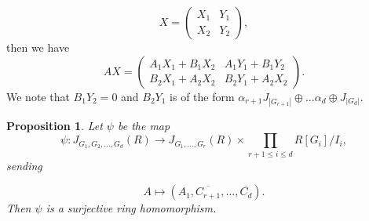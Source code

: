\documentclass[12pt, a4paper]{amsart}
\numberwithin{equation}{section} %
\theoremstyle{plain}
\theoremstyle{definition}
\theoremstyle{plain}
\newtheorem{prop}[thm]{Proposition}
\theoremstyle{remark}
\newcommand{\ones}{J}
\begin{document}
\[ X =\begin{pmatrix} X_1 & Y_1 \\ X_2 & Y_2 \end{pmatrix} ,\]
then we have 
\[ AX= \begin{pmatrix} A_1X_1+B_1 X_2 & A_1 Y_1 + B_1 Y_2 \\ B_2 X_1+A_2 X_2 & B_2 Y_1+ A_2 X_2 \end{pmatrix} .\] 
We note that $B_1 Y_2=0$ and $B_2 Y_1$ is of the form $\alpha_{r+1} \ones_{|G_{r+1}|} \oplus \ldots \alpha_{d} \oplus \ones_{|G_d|}$. 

\begin{prop}
Let $\psi$ be the map 
\[ \psi: J_{G_1, G_2, \ldots, G_d}(R) \to J_{G_1, \ldots, G_r}(R) \times \prod_{r+1 \leq i \leq d} R[G_i]/I_i ,\]
sending 

\[ A \mapsto (A_1, \overline{C_{r+1}}, \ldots, \overline{C_{d}}) .\] 
Then $\psi$ is a surjective ring homomorphism. 
\end{prop}
\end{document}
